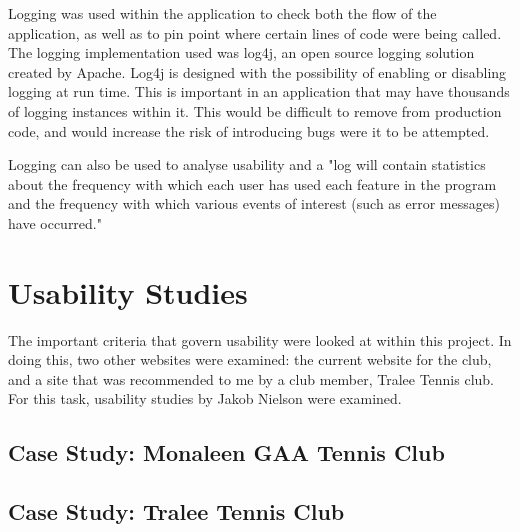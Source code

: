 Logging was used within the application to check both the flow of the application, as well as to pin point where certain lines of code were being called. The logging implementation used was log4j, an open source logging solution created by Apache. Log4j is designed with the possibility of enabling or disabling logging at run time. This is important in an application that may have thousands of logging instances within it. This would be difficult to remove from production code, and would increase the risk of introducing bugs were it to be attempted. 

Logging can also be used to analyse usability and a "log will contain statistics about the frequency with which each user has used each feature in the program and the frequency with which various events of interest (such as error messages) have occurred." \parencite{holzinger2005usability}

\section{Usability Studies}

The important criteria that govern usability were looked at within this project. In doing this, two other websites were examined: the current website for the club, and a site that was recommended to me by a club member, Tralee Tennis club. For this task, usability studies by Jakob Nielson were examined. 

\subsection{Case Study: Monaleen GAA Tennis Club}

\subsection{Case Study: Tralee Tennis Club}